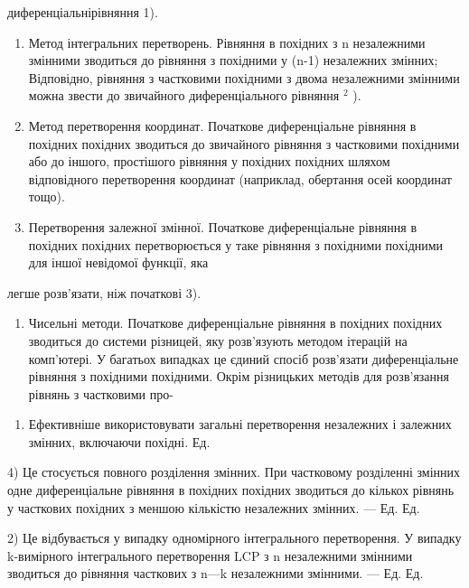 \documentclass[
  ukrainian,
]{article}
\providecommand{\tightlist}{%
  \setlength{\itemsep}{0pt}\setlength{\parskip}{0pt}}
\begin{document}
диференціальнірівняння 1).

\begin{enumerate}
\def\labelenumi{\arabic{enumi}.}
\setcounter{enumi}{1}
\item
  Метод інтегральних перетворень. Рівняння в похідних з n незалежними
  змінними зводиться до рівняння з похідними у (n-1) незалежних змінних;
  Відповідно, рівняння з частковими похідними з двома незалежними
  змінними можна звести до звичайного диференціального рівняння \(^2\)
  ).
\item
  Метод перетворення координат. Початкове диференціальне рівняння в
  похідних похідних зводиться до звичайного рівняння з частковими
  похідними або до іншого, простішого рівняння у похідних похідних
  шляхом відповідного перетворення координат (наприклад, обертання осей
  координат тощо).
\item
  Перетворення залежної змінної. Початкове диференціальне рівняння в
  похідних похідних перетворюється у таке рівняння з похідними похідними
  для іншої невідомої функції, яка
\end{enumerate}

легше розв'язати, ніж початкові 3).

\begin{enumerate}
\def\labelenumi{\arabic{enumi}.}
\setcounter{enumi}{4}
\tightlist
\item
  Чисельні методи. Початкове диференціальне рівняння в похідних похідних
  зводиться до системи різницей, яку розв'язують методом ітерацій на
  комп'ютері. У багатьох випадках це єдиний спосіб розв'язати
  диференціальне рівняння з похідними похідними. Окрім різницьких
  методів для розв'язання рівнянь з частковими про-
\end{enumerate}

\begin{enumerate}
\def\labelenumi{\alph{enumi})}
\setcounter{enumi}{4}
\tightlist
\item
  Ефективніше використовувати загальні перетворення незалежних і
  залежних змінних, включаючи похідні. Ед.
\end{enumerate}

4) Це стосується повного розділення змінних. При частковому розділенні
змінних одне диференціальне рівняння в похідних похідних зводиться до
кількох рівнянь у часткових похідних з меншою кількістю незалежних
змінних. --- Ед. Ед.

2) Це відбувається у випадку одномірного інтегрального перетворення. У
випадку k-вимірного інтегрального перетворення LCP з n незалежними
змінними зводиться до рівняння часткових з n---k незалежними змінними.
--- Ед. Ед.
\end{document}
